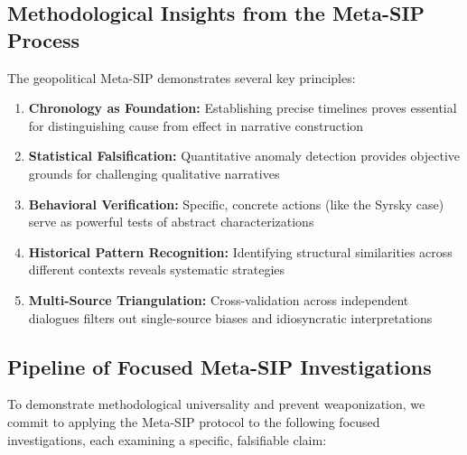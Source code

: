 \documentclass[11pt,a4paper]{article}
\begin{document}
\subsection{Methodological Insights from the Meta-SIP Process}

The geopolitical Meta-SIP demonstrates several key principles:

\begin{enumerate}[leftmargin=*]
    \item \textbf{Chronology as Foundation:} Establishing precise timelines proves essential for distinguishing cause from effect in narrative construction
    \item \textbf{Statistical Falsification:} Quantitative anomaly detection provides objective grounds for challenging qualitative narratives
    \item \textbf{Behavioral Verification:} Specific, concrete actions (like the Syrsky case) serve as powerful tests of abstract characterizations
    \item \textbf{Historical Pattern Recognition:} Identifying structural similarities across different contexts reveals systematic strategies
    \item \textbf{Multi-Source Triangulation:} Cross-validation across independent dialogues filters out single-source biases and idiosyncratic interpretations
\end{enumerate}


\subsection{Pipeline of Focused Meta-SIP Investigations}

To demonstrate methodological universality and prevent weaponization, 
we commit to applying the Meta-SIP protocol to the following focused 
investigations, each examining a specific, falsifiable claim:
\end{document}
